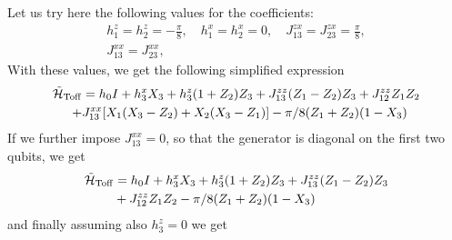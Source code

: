 Let us try here the following values for the coefficients:
\begin{equation}
\begin{gathered}
  h_1^z = h_2^z = -\frac{\pi}{8},\quad
  h_1^x = h_2^x = 0,
  \quad J_{13}^{zx} = J_{23}^{zx} = \frac{\pi}{8}, \\
  J_{13}^{xx} = J_{23}^{xx},
\end{gathered}
\end{equation}
With these values, we get the following simplified expression
\begin{equation}
\begin{aligned}
  \tilde{\mathcal{H}}_{\operatorname{Toff}} &= h_0 I + h_3^x X_3 + h_3^z(1+ Z_2)Z_3
  + J_{13}^{zz}(Z_1 - Z_2)Z_3 + J_{12}^{zz} Z_1 Z_2 \\
  + &J_{13}^{xx} [X_1(X_3 - Z_2) + X_2(X_3 - Z_1)]
  - \pi/8 ( Z_1 +  Z_2)(1 - X_3)
\end{aligned}
\end{equation}
If we further impose $J_{13}^{xx}=0$, so that the generator is diagonal on the first two qubits, we get
\begin{equation}
\begin{aligned}
    \tilde{\mathcal{H}}_{\operatorname{Toff}} &= h_0 I + h_3^x X_3 + h_3^z(1+ Z_2)Z_3
    + J_{13}^{zz}(Z_1 - Z_2)Z_3 \\
    &+ J_{12}^{zz} Z_1 Z_2 - \pi/8 (Z_1 +  Z_2)(1 - X_3)
\end{aligned}
\end{equation}
and finally assuming also $h_3^z=0$ we get
